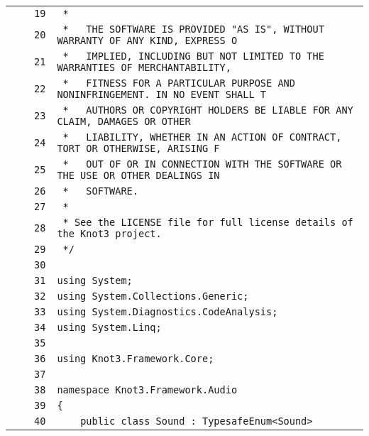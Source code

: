 \documentclass[a4paper,10pt]{article}
\begin{document}
\begin{longtable}[l]{lrrl}
\cellcolor{gray} &  & \verb~19~ & \verb~ *~\\
\cellcolor{gray} &  & \verb~20~ & \verb~ *   THE SOFTWARE IS PROVIDED "AS IS", WITHOUT WARRANTY OF ANY KIND, EXPRESS O~\\
\cellcolor{gray} &  & \verb~21~ & \verb~ *   IMPLIED, INCLUDING BUT NOT LIMITED TO THE WARRANTIES OF MERCHANTABILITY,~\\
\cellcolor{gray} &  & \verb~22~ & \verb~ *   FITNESS FOR A PARTICULAR PURPOSE AND NONINFRINGEMENT. IN NO EVENT SHALL T~\\
\cellcolor{gray} &  & \verb~23~ & \verb~ *   AUTHORS OR COPYRIGHT HOLDERS BE LIABLE FOR ANY CLAIM, DAMAGES OR OTHER~\\
\cellcolor{gray} &  & \verb~24~ & \verb~ *   LIABILITY, WHETHER IN AN ACTION OF CONTRACT, TORT OR OTHERWISE, ARISING F~\\
\cellcolor{gray} &  & \verb~25~ & \verb~ *   OUT OF OR IN CONNECTION WITH THE SOFTWARE OR THE USE OR OTHER DEALINGS IN~\\
\cellcolor{gray} &  & \verb~26~ & \verb~ *   SOFTWARE.~\\
\cellcolor{gray} &  & \verb~27~ & \verb~ *~\\
\cellcolor{gray} &  & \verb~28~ & \verb~ * See the LICENSE file for full license details of the Knot3 project.~\\
\cellcolor{gray} &  & \verb~29~ & \verb~ */~\\
\cellcolor{gray} &  & \verb~30~ & \verb~~\\
\cellcolor{gray} &  & \verb~31~ & \verb~using System;~\\
\cellcolor{gray} &  & \verb~32~ & \verb~using System.Collections.Generic;~\\
\cellcolor{gray} &  & \verb~33~ & \verb~using System.Diagnostics.CodeAnalysis;~\\
\cellcolor{gray} &  & \verb~34~ & \verb~using System.Linq;~\\
\cellcolor{gray} &  & \verb~35~ & \verb~~\\
\cellcolor{gray} &  & \verb~36~ & \verb~using Knot3.Framework.Core;~\\
\cellcolor{gray} &  & \verb~37~ & \verb~~\\
\cellcolor{gray} &  & \verb~38~ & \verb~namespace Knot3.Framework.Audio~\\
\cellcolor{gray} &  & \verb~39~ & \verb~{~\\
\cellcolor{gray} &  & \verb~40~ & \verb~    public class Sound : TypesafeEnum<Sound>~\\

\end{longtable}
\end{document}
